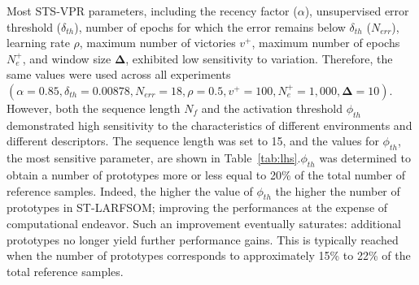 \documentclass[letterpaper, 10 pt, conference]{ieeeconf}  %
\begin{document}
Most STS-VPR parameters, including the recency factor ($\alpha$), unsupervised error threshold ($\delta_{th}$), number of epochs for which the error remains below $\delta_{th}$ ($N_{err}$), learning rate $\rho$, maximum number of victories $v^+$, maximum number of epochs $N_e^+$, and window size $\mathbf{\Delta}$, exhibited low sensitivity to variation. Therefore, the same values were used across all experiments $(\alpha = 0.85, \delta_{th} = 0.00878, N_{err} = 18, \rho = 0.5, v^+ = 100, N_e^+ = 1{,}000, \mathbf{\Delta} = 10)$. However, both the sequence length $N_{f}$ and the activation threshold \(\phi_{th}\) demonstrated high sensitivity to the characteristics of different environments and different descriptors. The sequence length was set to 15, and the values for \(\phi_{th}\), the most sensitive parameter, are shown in Table~\ref{tab:lhs}.\(\phi_{th}\) was determined to obtain a number of prototypes more or less equal to 20\% of the total number of reference samples. Indeed, the higher the value of \(\phi_{th}\) the higher the number of prototypes in ST-LARFSOM; improving the performances at the expense of computational endeavor. Such an improvement eventually saturates: additional prototypes no longer yield further performance gains. This is typically reached when the number of prototypes corresponds to approximately 15\% to 22\% of the total reference samples.

\begin{table}[h]
\centering
\caption{Activation threshold ($\phi_{th}$) values for each dataset and descriptor.}
\label{tab:lhs}
\end{table}
\end{document}
